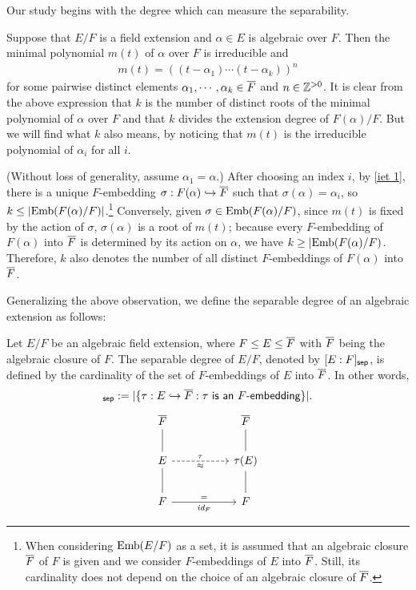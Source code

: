 Our study begins with the degree which can measure the separability.
\begin{obs}
    Suppose that $E/F$ is a field extension and $\alpha\in E$ is algebraic over $F$.
    Then the minimal polynomial $m(t)$ of $\alpha$ over $F$ is irreducible and
    \begin{align*}
        m(t)=((t-\alpha_1)\cdots(t-\alpha_k))^n
    \end{align*}
    for some pairwise distinct elements $\alpha_1, \cdots, \alpha_k\in\overline{F}$ and $n\in{\mathbb{Z}}^{>0}$.
    It is clear from the above expression that $k$ is the number of distinct roots of the minimal polynomial of $\alpha$ over $F$ and that $k$ divides the extension degree of $F(\alpha)/F$.
    But we will find what $k$ also means, by noticing that $m(t)$ is the irreducible polynomial of $\alpha_i$ for all $i$.
    
    (Without loss of generality, assume $\alpha_1=\alpha$.)
    After choosing an index $i$, by \cref{iet 1}, there is a unique $F$-embedding $\sigma: F(\alpha)\hookrightarrow\overline{F}$ such that $\sigma(\alpha)=\alpha_i$, so $k\leq|{\textrm{Emb}({F(\alpha)/F})}|$.\footnote{When considering ${\textrm{Emb}({E/F})}$ as a set, it is assumed that an algebraic closure $\overline{F}$ of $F$ is given and we consider $F$-embeddings of $E$ into $\overline{F}$. Still, its cardinality does not depend on the choice of an algebraic closure of $\overline{F}$.}
    Conversely, given $\sigma\in{\textrm{Emb}({F(\alpha)/F})}$, since $m(t)$ is fixed by the action of $\sigma$, $\sigma(\alpha)$ is a root of $m(t)$; because every $F$-embedding of $F(\alpha)$ into $\overline{F}$  is determined by its action on $\alpha$, we have $k\geq|{\textrm{Emb}({F(\alpha)/F})}$.
    Therefore, $k$ also denotes the number of all distinct $F$-embeddings of $F(\alpha)$ into $\overline{F}$.
\end{obs}
Generalizing the above observation, we define the separable degree of an algebraic extension as follows:
\begin{defi}\label{old separable degree}
    Let $E/F$ be an algebraic field extension, where $F\leq E\leq \overline{F}$ with $\overline{F}$ being the algebraic closure of $F$.
    The separable degree of $E/F$, denoted by $[E:F]_{\textsf{sep}}$, is defined by the cardinality of the set of $F$-embeddings of $E$ into $\overline{F}$.
    In other words,
    \begin{align*}
        [E:F]_\sep:=|\{\tau: E\hookrightarrow\ol F: \textsf{$\tau$ is an $F$-embedding}\}|.
    \end{align*}
    \begin{equation*}
    \begin{tikzcd}[row sep=0.7cm, column sep=1.8cm]
        \ol F
        &
        \ol F
        \\
        E
            \arrow[u, dash]
            \arrow[r, "\tau", "\approx"', dashed]
        &
        \tau(E)
            \arrow[u, dash]
        \\
        F
            \arrow[u, dash]
            \arrow[r, "=", "\id{F}"']
        &
        F
            \arrow[u, dash]
    \end{tikzcd}
    \end{equation*}
\end{defi}

